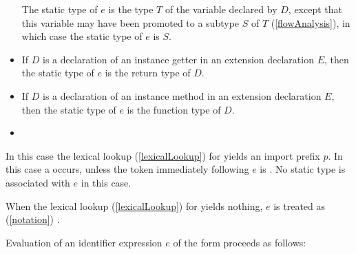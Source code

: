 \documentclass[makeidx]{article}
\begin{document}
\begin{itemize}
  The static type of $e$ is the type $T$ of the variable \id{} declared by $D$,
  except that this variable may have been promoted to a subtype $S$ of $T$
  (\ref{flowAnalysis}),
  in which case the static type of $e$ is $S$.
\item
  If $D$ is a declaration of an instance getter
  in an extension declaration $E$,
  then the static type of $e$ is the return type of $D$.
\item
  If $D$ is a declaration of an instance method
  in an extension declaration $E$,
  then the static type of $e$ is the function type of $D$.
\item
\end{itemize}
\vspace{-\baselineskip}\EndCase

\LMHash{}%
In this case the lexical lookup
(\ref{lexicalLookup})
for \id{} yields an import prefix $p$.
In this case a  occurs,
unless the token immediately following $e$ is .
No static type is associated with $e$ in this case.

\EndCase

\LMHash{}%
When the lexical lookup
(\ref{lexicalLookup})
for \id{} yields nothing,
$e$ is treated as
(\ref{notation})
.

\EndCase

\LMHash{}%
Evaluation of an identifier expression $e$ of the form \id{}
proceeds as follows:
\end{document}
